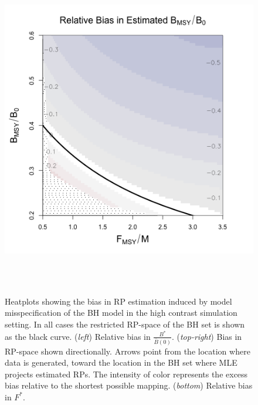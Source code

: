 %
\begin{figure}[h!]
\begin{minipage}[h!]{0.46\textwidth}
\hspace*{-0.5cm}
\includegraphics[width=1.175\textwidth]{../gpBias/zetaRelBiasSchnuteExpT45N150Wide.png}\\
\hspace*{1cm}
\vspace{-1cm}
\caption{\label{contrastTrio}
Heatplots showing the bias in RP estimation induced by model misspecification of
the BH model in the high contrast simulation setting.
In all cases the restricted RP-space of the BH set is shown as the black curve.
(\emph{left}) Relative bias in $\frac{B^*}{\bar B(0)}$.  (\emph{top-right})
Bias in RP-space shown directionally. Arrows point from the location where
data is generated, toward the location in the BH set where MLE projects estimated
RPs. The intensity of color represents the excess bias relative
to the shortest possible mapping. (\emph{bottom}) Relative bias in $F^*$.
}
$~$\\$~$\\
\end{minipage}
\begin{minipage}[h!]{0.44\textwidth}
\vspace{-0.8cm}
\hspace*{-0.1cm}

\end{minipage}
\end{figure}

